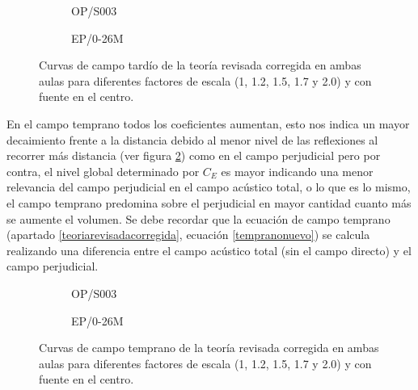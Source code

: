 \begin{figure}[ht]
    \begin{subfigure}[b]{0.4\textwidth}
    	\centering%
         {%
    }
    \caption{OP/S003}%
    \end{subfigure}%
    \hspace{1.65cm}%
    \begin{subfigure}[b]{0.4\textwidth}%
    	\centering%
        {%
    }
    \caption{EP/0-26M}%
    \end{subfigure}
    \caption{Curvas de campo tardío de la teoría revisada corregida en ambas aulas para diferentes factores de escala (1, 1.2, 1.5, 1.7 y 2.0) y con fuente en el centro.}
\label{graf:campoperjudicialfactorescentro}%
\end{figure}
\FloatBarrier 

En el campo temprano todos los coeficientes aumentan, esto nos indica un mayor decaimiento frente a la distancia debido al menor nivel de las reflexiones al recorrer más distancia (ver figura \ref{graf:campotempranofactorescentro}) como en el campo perjudicial pero por contra, el nivel global determinado por $C_E$ es mayor indicando una menor relevancia del campo perjudicial en el campo acústico total, o lo que es lo mismo, el campo temprano predomina sobre el perjudicial en mayor cantidad cuanto más se aumente el volumen. Se debe recordar que la ecuación de campo temprano (apartado \ref{teoriarevisadacorregida}, ecuación \ref{tempranonuevo}) se calcula realizando una diferencia entre el campo acústico total (sin el campo directo) y el campo perjudicial.





\begin{figure}[ht]
    \begin{subfigure}[b]{0.4\textwidth}
    	\centering%
         {%
    }
    \caption{OP/S003}%
    \end{subfigure}%
    \hspace{1.65cm}%
    \begin{subfigure}[b]{0.4\textwidth}%
    	\centering%
        {%
    }
    \caption{EP/0-26M}%
    \end{subfigure}
    \caption{Curvas de campo temprano de la teoría revisada corregida en ambas aulas para diferentes factores de escala (1, 1.2, 1.5, 1.7 y 2.0) y con fuente en el centro.}
\label{graf:campotempranofactorescentro}%
\end{figure}
\FloatBarrier 


